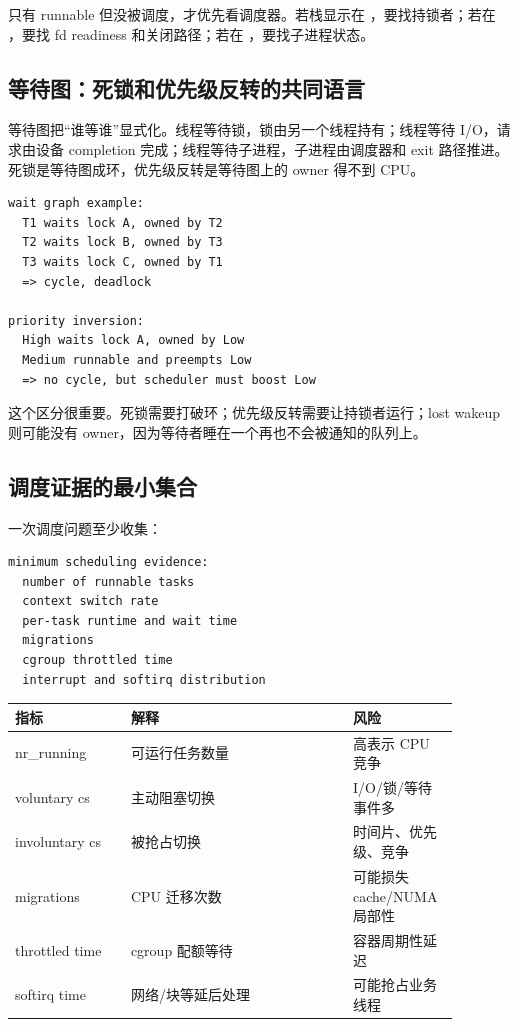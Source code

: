 只有 runnable 但没被调度，才优先看调度器。若栈显示在 ，要找持锁者；若在 ，要找 fd readiness 和关闭路径；若在 ，要找子进程状态。

\subsection{等待图：死锁和优先级反转的共同语言}

等待图把“谁等谁”显式化。线程等待锁，锁由另一个线程持有；线程等待 I/O，请求由设备 completion 完成；线程等待子进程，子进程由调度器和 exit 路径推进。死锁是等待图成环，优先级反转是等待图上的 owner 得不到 CPU。

\begin{lstlisting}
wait graph example:
  T1 waits lock A, owned by T2
  T2 waits lock B, owned by T3
  T3 waits lock C, owned by T1
  => cycle, deadlock

priority inversion:
  High waits lock A, owned by Low
  Medium runnable and preempts Low
  => no cycle, but scheduler must boost Low
\end{lstlisting}

这个区分很重要。死锁需要打破环；优先级反转需要让持锁者运行；lost wakeup 则可能没有 owner，因为等待者睡在一个再也不会被通知的队列上。

\subsection{调度证据的最小集合}

一次调度问题至少收集：

\begin{lstlisting}
minimum scheduling evidence:
  number of runnable tasks
  context switch rate
  per-task runtime and wait time
  migrations
  cgroup throttled time
  interrupt and softirq distribution
\end{lstlisting}

\begin{longtable}{|p{0.24\linewidth}|p{0.46\linewidth}|p{0.18\linewidth}|}
\toprule
指标 & 解释 & 风险 \\
\midrule
nr\_running & 可运行任务数量 & 高表示 CPU 竞争 \\\tablerowrule
voluntary cs & 主动阻塞切换 & I/O/锁/等待事件多 \\\tablerowrule
involuntary cs & 被抢占切换 & 时间片、优先级、竞争 \\\tablerowrule
migrations & CPU 迁移次数 & 可能损失 cache/NUMA 局部性 \\\tablerowrule
throttled time & cgroup 配额等待 & 容器周期性延迟 \\\tablerowrule
softirq time & 网络/块等延后处理 & 可能抢占业务线程 \\
\bottomrule
\end{longtable}

